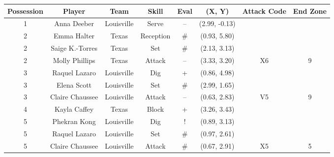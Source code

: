\begin{tabular}{cccccccc}
   Possession   & Player          & Team         & Skill                 & Eval          & (X, Y)                  & Attack Code  & End Zone\\
  \hline
   1            & Anna Deeber         & Louisville &  Serve         &  --    &  (2.99, -0.13) \\
   2            & Emma Halter         & Texas &  Reception     &  \# &  (0.93, 5.80) \\
   2            & Saige K.-Torres     & Texas &  Set           &  \# &  (2.13, 3.13) \\
   2            & Molly Phillips      & Texas &  Attack        &  -- &  (3.33, 3.20) &  X6             & 9\\
   3            & Raquel Lazaro       & Louisville &  Dig           &  +     &  (0.86, 4.98) \\
   3            & Elena Scott         & Louisville &  Set           &  \#    &  (2.99, 1.65) \\
   3            & Claire Chaussee     & Louisville &  Attack        &  --    &  (0.63, 2.83)    &  V5  & 9\\
   4            & Kayla Caffey        & Texas &  Block         &  +  &  (3.26, 3.43) \\
   5            & Phekran Kong        & Louisville &  Dig           &  !     &  (0.89, 3.13) \\
   5            & Raquel Lazaro       & Louisville &  Set           &  \#    &  (0.97, 2.61) \\
   5            & Claire Chaussee     & Louisville &  Attack        &  \#    &  (0.67, 2.91)    &  X5  & 5\\
\end{tabular}
